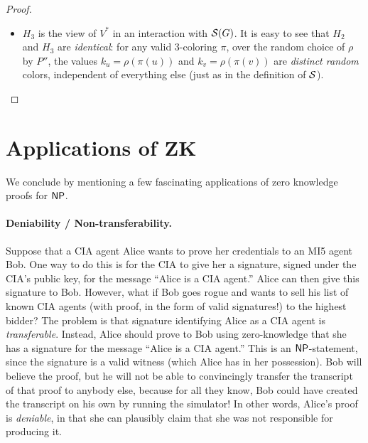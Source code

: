 \documentclass[11pt]{article}
\begin{document}
\begin{proof}
\begin{itemize}
    Using the computational hiding property of the commitment scheme,
    one can show that $H_{1} \compind H_{2}$.  To do this formally, we
    would actually consider a sequence of ``sub-hybrids'' in which one
    color $k_{i}$ at a time is changed from its ``true'' value
    $\rho(\pi(i))$ (as in $H_{1}$) to its ``simulated'' value $1$ (as
    in $H_{2}$).  We remark that the reduction from breaking the
    commitment scheme to distinguishing adjacent sub-hybrids uses
    \emph{non-uniformity} in an essential way, because to simulate the
    entire view of $V^{*}$ (given a commitment to either
    $\rho(\pi(i))$ or $1$), the simulator needs to have $G$ and $\pi$
    ``hard-coded'' into it.  (This is a rather technical point, but is
    an important one for a rigorous proof.)

  \item $H_{3}$ is the view of $V^{*}$ in an interaction with
    $\mathcal{S}(G)$.  It is easy to see that $H_{2}$ and $H_{3}$ are
    \emph{identical}: for any valid $3$-coloring $\pi$, over the
    random choice of $\rho$ by $P''$, the values $k_{u} =
    \rho(\pi(u))$ and $k_{v} = \rho(\pi(v))$ are \emph{distinct
      random} colors, independent of everything else (just as in the
    definition of $\mathcal{S}$). \qedhere
  \end{itemize}
\end{proof}

\section{Applications of ZK}
\label{sec:applications-zk}

We conclude by mentioning a few fascinating applications of zero
knowledge proofs for $\mathsf{NP}$.

\paragraph{Deniability / Non-transferability.}

Suppose that a CIA agent Alice wants to prove her credentials to an
MI5 agent Bob.  One way to do this is for the CIA to give her a
signature, signed under the CIA's public key, for the message ``Alice
is a CIA agent.''  Alice can then give this signature to Bob.
However, what if Bob goes rogue and wants to sell his list of known
CIA agents (with proof, in the form of valid signatures!) to the
highest bidder?  The problem is that signature identifying Alice as a
CIA agent is \emph{transferable}.  Instead, Alice should prove to Bob
using zero-knowledge that she has a signature for the message ``Alice
is a CIA agent.''  This is an $\mathsf{NP}$-statement, since the signature is
a valid witness (which Alice has in her possession).  Bob will believe
the proof, but he will not be able to convincingly transfer the
transcript of that proof to anybody else, because for all they know,
Bob could have created the transcript on his own by running the
simulator!  In other words, Alice's proof is \emph{deniable}, in that
she can plausibly claim that she was not responsible for producing it.
\end{document}
